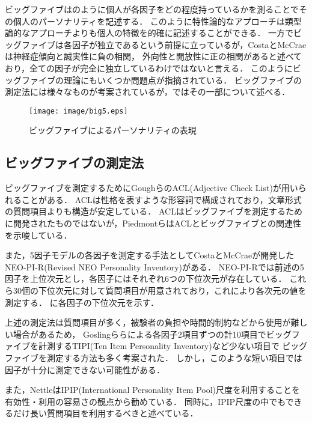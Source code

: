 ビッグファイブはのように個人が各因子をどの程度持っているかを測ることでその個人のパーソナリティを記述する．
このように特性論的なアプローチは類型論的なアプローチよりも個人の特徴を的確に記述することができる．
一方でビッグファイブは各因子が独立であるという前提に立っているが，CostaとMcCrae\cite{neo-pi-r}は神経症傾向と誠実性に負の相関，
外向性と開放性に正の相関があると述べており，全ての因子が完全に独立しているわけではないと言える\cite{eysenck-handbook}．
このようにビッグファイブの理論にもいくつか問題点が指摘されている．
ビッグファイブの測定法には様々なものが考案されているが，ではその一部について述べる．


\begin{figure}[htb]
    \centering
    \texttt{[image: image/big5.eps]}
    \caption{ビッグファイブによるパーソナリティの表現}
    \label{fig:big5}
\end{figure}

\subsection{ビッグファイブの測定法}
\label{sec:mesure}
ビッグファイブを測定するためにGoughら\cite{acl}のACL(Adjective Check List)が用いられることがある．
ACLは性格を表すような形容詞で構成されており，文章形式の質問項目よりも構造が安定している．
ACLはビッグファイブを測定するために開発されたものではないが，Piedmontら\cite{big5-acl}はACLとビッグファイブとの関連性を示唆している．

また，5因子モデルの各因子を測定する手法としてCostaとMcCrae\cite{neo-pi-r}が開発したNEO-PI-R(Revised NEO Personality Inventory)がある．
NEO-PI-Rでは前述の5因子を上位次元とし，各因子にはそれぞれ6つの下位次元が存在している．
これら30個の下位次元に対して質問項目が用意されており，これにより各次元の値を測定する．
に各因子の下位次元を示す．

上述の測定法は質問項目が多く，被験者の負担や時間的制約などから使用が難しい場合があるため，
Goslingら\cite{tipi}らによる各因子2項目ずつの計10項目でビッグファイブを計測するTIPI(Ten Item Personality Inventory)など少ない項目で
ビッグファイブを測定する方法も多く考案された．
しかし，このような短い項目では因子が十分に測定できない可能性がある．

また，Nettle\cite{daniel}はIPIP(International Personality Item Pool)尺度を利用することを有効性・利用の容易さの観点から勧めている．
同時に，IPIP尺度の中でもできるだけ長い質問項目を利用するべきと述べている．

